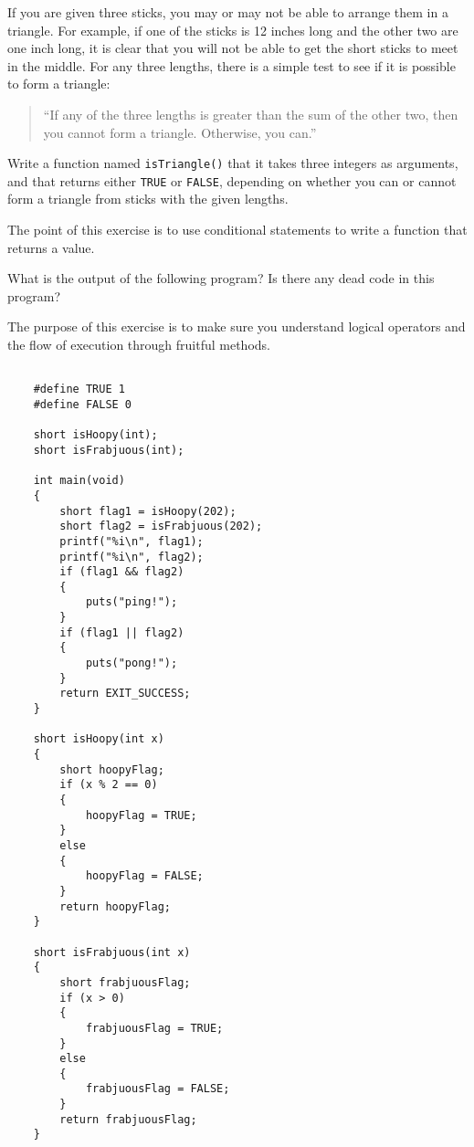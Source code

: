 

\begin{exercise}
If you are given three sticks, you may or may not be able to arrange
them in a triangle.  For example, if one of the sticks is 12 inches
long and the other two are one inch long, it is clear that you will
not be able to get the short sticks to meet in the middle.  For any
three lengths, there is a simple test to see if it is possible to form
a triangle:

\begin{quotation}
``If any of the three lengths is greater than the sum of the other two,
then you cannot form a triangle.  Otherwise, you can.''
\end{quotation}

Write a function named {\tt isTriangle()} that it takes three integers as
arguments, and that returns either {\tt TRUE} or {\tt FALSE},
depending on whether you can or cannot form a triangle from sticks
with the given lengths.


The point of this exercise is to use conditional statements to
write a function that returns a value.
\end{exercise}





\begin{exercise}
What is the output of the following program?  Is there any dead code in this program?

The purpose of this exercise is to make sure you understand logical operators and the flow of execution through fruitful methods.

\begin{verbatim}

    #define TRUE 1
    #define FALSE 0
    
    short isHoopy(int);
    short isFrabjuous(int);
    
    int main(void) 
    {
        short flag1 = isHoopy(202);
        short flag2 = isFrabjuous(202);
        printf("%i\n", flag1);
        printf("%i\n", flag2);
        if (flag1 && flag2) 
        {
            puts("ping!");
        }
        if (flag1 || flag2) 
        {
            puts("pong!");
        }
        return EXIT_SUCCESS;
    }

    short isHoopy(int x)
    {
        short hoopyFlag;
        if (x % 2 == 0) 
        {
            hoopyFlag = TRUE;
        } 
        else 
        {
            hoopyFlag = FALSE;
        }
        return hoopyFlag;
    }
    
    short isFrabjuous(int x) 
    {
        short frabjuousFlag;
        if (x > 0) 
        {
            frabjuousFlag = TRUE;
        }
        else 
        {
            frabjuousFlag = FALSE;
        }
        return frabjuousFlag;
    }
     
\end{verbatim}
\end{exercise}



